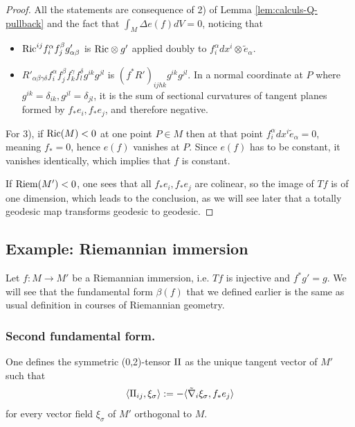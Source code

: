 \begin{proof}
All the statements are consequence of 2) of Lemma \ref{lem:calculs-Q-pullback} and the fact
that \(\int_M \Delta e(f)dV = 0\), noticing that
\begin{itemize}
\item \({\rm Ric}^{ij}f^\alpha_i f^\beta_j g'_{\alpha\beta}\) is \({\rm Ric}\otimes g'\)
applied doubly to \(f_i^\alpha dx^i\otimes\tilde e_\alpha\).
\item \(R'_{\alpha\beta\gamma\delta} f^\alpha_i f^\beta_j f^\gamma_k f^\delta_l
   g^{ik}g^{jl}\) is \((f^* R')_{ijhk}g^{ik}g^{jl}\). In a normal coordinate at \(P\)
where \(g^{ik}=\delta_{ik}, g^{jl}=\delta_{jl}\), it is the sum of sectional curvatures of tangent
planes formed by \(f_*e_i, f_*e_j\), and therefore negative.
\end{itemize}

For 3), if \({\rm Ric}(M)<0\) at one point \(P\in M\) then at that point \(f^\alpha_i dx^i \tilde
e_\alpha =0\), meaning \(f_*=0\), hence \(e(f)\) vanishes at \(P\). Since \(e(f)\) has to be constant, it vanishes identically, which implies that \(f\) is constant.

If \({\rm Riem}(M') < 0\), one sees that all \(f_* e_i, f_* e_j\) are colinear, so the image of \(Tf\) is of one dimension, which leads to the conclusion,
  as we will see later that a totally geodesic map transforms geodesic to geodesic.
\end{proof}



\subsection{Example: Riemannian immersion}
\label{sec:org00f7819}
Let \(f: M \longrightarrow M'\) be a Riemannian immersion, i.e. \(Tf\) is injective and \(f^*g' = g\). We will
see that the fundamental form \(\beta(f)\) that we defined earlier is the same as usual definition in courses of Riemannian geometry.
\subsubsection{Second fundamental form.}
\label{sec:orgad0ad89}
One defines the symmetric (0,2)-tensor \(\sff\) as the unique tangent vector of \(M'\) such that
\[
\langle \sff_{ij},\xi_\sigma \rangle:= -\langle \tilde\nabla_i\xi_\sigma, f_* e_j\rangle
\]
for every vector field \(\xi_\sigma\) of \(M'\) orthogonal to \(M\).


